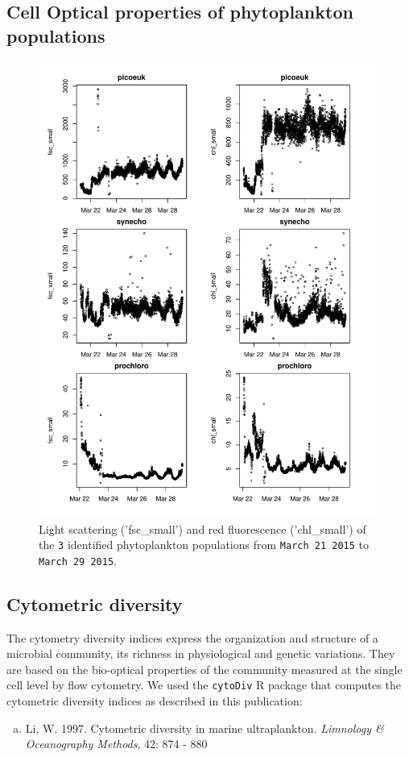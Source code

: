 \documentclass[a4paper]{article}
\begin{document}
\subsection{Cell Optical properties of phytoplankton populations}
\begin{figure}[H]
\centering
\includegraphics{CruiseReport-004}
\caption{Light scattering ('fsc\_small') and red fluorescence ('chl\_small') of the \texttt{3} identified phytoplankton populations from \texttt{March 21 2015} to \texttt{March 29 2015}.}%
\end{figure}


\newpage
\subsection{Cytometric diversity}
The cytometry diversity indices express the organization and structure of a microbial community, its richness in physiological and genetic variations. They are based on the bio-optical properties of the community measured at the single cell level by flow cytometry. We used the \texttt{cytoDiv} R package that computes the cytometric diversity indices as described in this publication:
\begin{enumerate}[(c)]
\item{
Li, W. 1997. Cytometric diversity in marine ultraplankton.  \newblock \emph{Limnology \& Oceanography Methods}, 42: 874 - 880
}
\end{enumerate}
\end{document}
